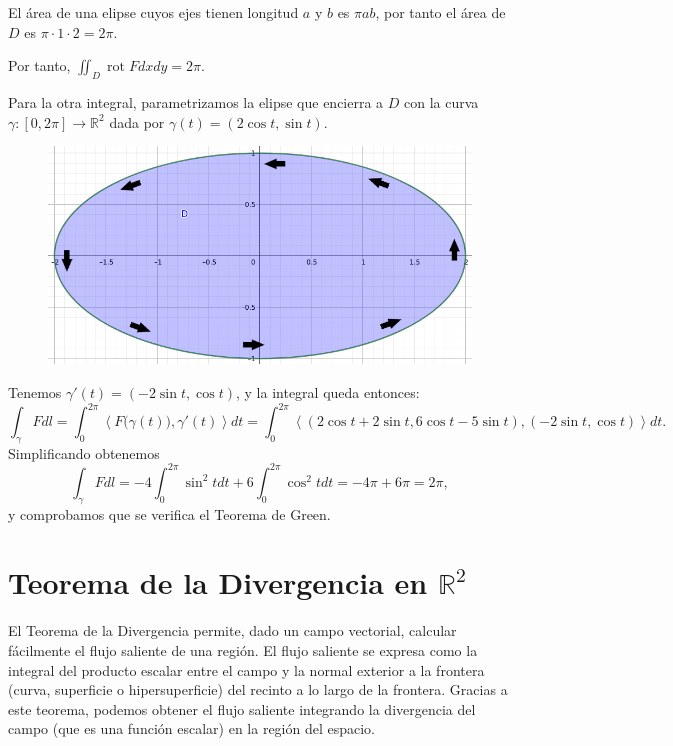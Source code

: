 \documentclass[12pt,spanish]{article}
\theoremstyle{definition}
\theoremstyle{remark}
\begin{document}
El área de una elipse cuyos ejes tienen longitud $a$ y $b$ es $\pi a b$, por tanto el área de $D$ es $\pi\cdot1\cdot 2=2\pi$.

Por tanto, $\displaystyle{\iint_D \operatorname{rot}F dx dy}=2\pi$.

Para la otra integral, parametrizamos la elipse que encierra a $D$ con la curva $\gamma:[0,2\pi]\rightarrow\mathbb{R}^2$ dada por $\gamma(t)=(2\cos t, \sin t)$.

\begin{figure}[H]
	\centering
	\includegraphics[width=120mm]{images/region-ejemplo-green-flechas}
\end{figure}

Tenemos $\gamma'(t)=(-2\sin t, \cos t)$, y la integral queda entonces:
\[\int_\gamma F dl = \int_0^{2\pi}\left\langle F\big(\gamma(t)\big),\gamma'(t)\right\rangle dt=\int_0^{2\pi}\left\langle (2\cos t+2\sin t,6\cos t-5\sin t),(-2\sin t, \cos t)\right\rangle dt.\]
Simplificando obtenemos
\[\int_\gamma F dl=-4\int_0^{2\pi}\sin^2 t dt +6\int_0^{2\pi}\cos^2 t dt=-4\pi+6\pi=2\pi,\]
y comprobamos que se verifica el Teorema de Green.

\section{Teorema de la Divergencia en $\mathbb{R}^2$}

El Teorema de la Divergencia permite, dado un campo vectorial, calcular fácilmente el flujo saliente de una región. El flujo saliente se expresa como la integral del producto escalar entre el campo y la normal exterior a la frontera (curva, superficie o hipersuperficie) del recinto a lo largo de la frontera. Gracias a este teorema, podemos obtener el flujo saliente integrando la divergencia del campo (que es una función escalar) en la región del espacio.
\end{document}
